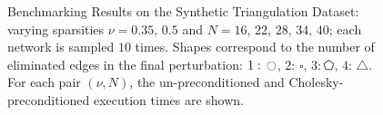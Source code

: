 \begin{figure}[t]
    \centering
        \caption{Benchmarking Results on the Synthetic Triangulation Dataset: varying sparsities $\nu=0.35, \, 0.5$ and $N=16, \, 22, \, 28, \, 34, \, 40$; each network is sampled $10$ times. Shapes correspond to the number of eliminated edges in the final perturbation: $1: \, \ocircle$, $2: \, \square$, $3: \pentagon$, $4: \, \triangle$. For each pair $(\nu, N)$, the un-preconditioned and Cholesky-preconditioned execution times are shown.}
        \vspace{-10pt}
\end{figure}

